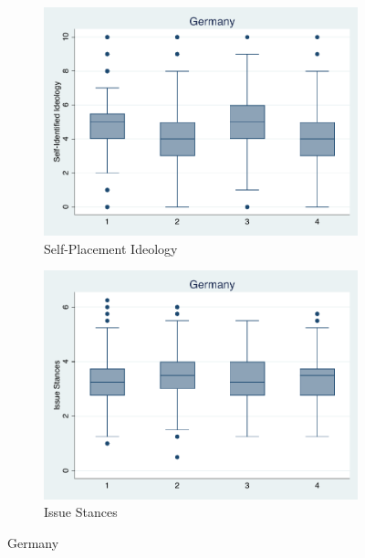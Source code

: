 \documentclass[12pt, titlepage]{article}
\begin{document}
\begin{figure}[H]
	\centering
	\begin{subfigure}[b]{0.475\textwidth}   
		\centering 
		\includegraphics[width=\textwidth]{IdeoBP/Germany}
		\caption{Self-Placement Ideology}
	\end{subfigure}
	\hfill
	\begin{subfigure}[b]{0.475\textwidth}
		\centering 
		\includegraphics[width=\textwidth]{BoxLib/Germany}
		\caption{Issue Stances}
	\end{subfigure}
	\caption{Germany}
	\label{Germany}
\end{figure}
\end{document}
